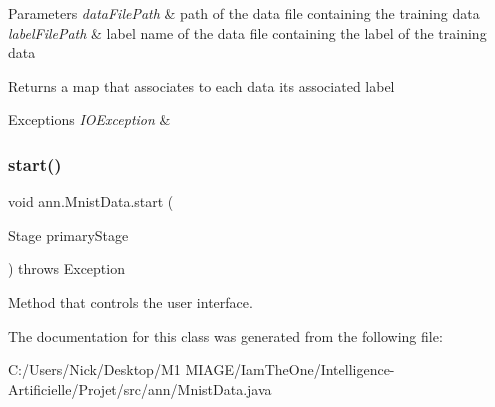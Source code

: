 \begin{DoxyParams}{Parameters}
{\em data\+File\+Path} & path of the data file containing the training data \\
\hline
{\em label\+File\+Path} & label name of the data file containing the label of the training data \\
\hline
\end{DoxyParams}
\begin{DoxyReturn}{Returns}
a map that associates to each data its associated label 
\end{DoxyReturn}

\begin{DoxyExceptions}{Exceptions}
{\em I\+O\+Exception} & \\
\hline
\end{DoxyExceptions}
\mbox{\label{classann_1_1_mnist_data_a163423e53cf98cbc9c7517f40a1a2476}} 
\subsubsection{\texorpdfstring{start()}{start()}}
{\footnotesize\ttfamily void ann.\+Mnist\+Data.\+start (\begin{DoxyParamCaption}\item[{Stage}]{primary\+Stage }\end{DoxyParamCaption}) throws Exception}

Method that controls the user interface. 

The documentation for this class was generated from the following file\+:\begin{DoxyCompactItemize}
\item 
C\+:/\+Users/\+Nick/\+Desktop/\+M1 M\+I\+A\+G\+E/\+Iam\+The\+One/\+Intelligence-\/\+Artificielle/\+Projet/src/ann/Mnist\+Data.\+java\end{DoxyCompactItemize}
